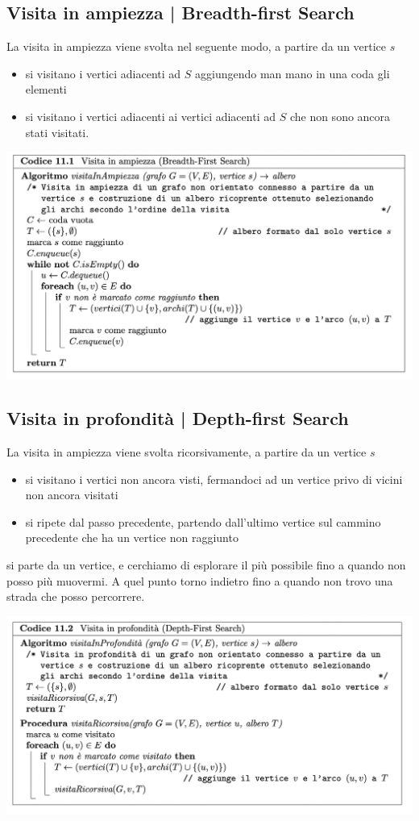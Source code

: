 \documentclass[11pt, oneside]{article}   	%
\begin{document}
\subsection*{Visita in ampiezza | Breadth-first Search}
La visita in ampiezza viene svolta nel seguente modo, a partire da un vertice $s$
\begin{itemize}
\item si visitano i vertici adiacenti ad $S$ aggiungendo man mano in una coda gli elementi
\item si visitano i vertici adiacenti ai vertici adiacenti ad $S$ che non sono ancora stati visitati.
\end{itemize}
\begin{center}
\includegraphics[scale=0.6]{ampiezza}
\end{center}

\subsection*{Visita in profondità | Depth-first Search}
La visita in ampiezza viene svolta ricorsivamente, a partire da un vertice $s$
\begin{itemize}
\item si visitano i vertici non ancora visti, fermandoci ad un vertice privo di vicini non ancora visitati
\item si ripete dal passo precedente, partendo dall'ultimo vertice sul cammino precedente che ha un vertice non raggiunto
\end{itemize}
\footnotesize{si parte da un vertice, e cerchiamo di esplorare il più possibile fino a quando non posso più muovermi. A quel punto torno indietro fino a quando non trovo una strada che posso percorrere.}
\begin{center}
\includegraphics[scale=0.6]{profo}
\end{center}
\end{document}
